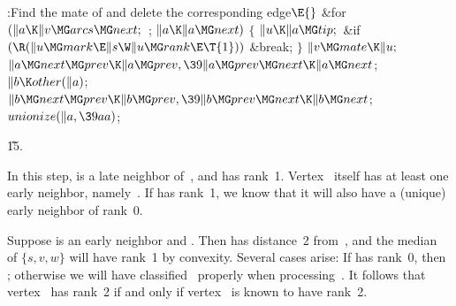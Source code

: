 \Y\B\4:Find the mate of  and delete the corresponding edge\X${}%
\E{}$\6
\&{for} ${}(\|a\K\|v\MG\\{arcs}\MG\\{next};{}$  ; ${}\|a\K\|a\MG\\{next}){}$\5
${}\{{}$\1\6
${}\|u\K\|a\MG\\{tip};{}$\6
\&{if} ${}(\R(\|u\MG\\{mark}\E\|s\W\|u\MG\\{rank}\E\T{1})){}$\1\5
\&{break};\2\6
\4${}\}{}$\2\6
${}\|v\MG\\{mate}\K\|u;{}$\6
${}\|a\MG\\{next}\MG\\{prev}\K\|a\MG\\{prev},\39\|a\MG\\{prev}\MG\\{next}\K\|a%
\MG\\{next}{}$;\6
${}\|b\K\\{other}(\|a){}$;\6
${}\|b\MG\\{next}\MG\\{prev}\K\|b\MG\\{prev},\39\|b\MG\\{prev}\MG\\{next}\K\|b%
\MG\\{next}{}$;\6
${}\\{unionize}(\|a,\39\\{aa}){}$;\par
\U15.\fi

In this step,  is a late neighbor of~, and %
 has
rank~1. Vertex~ itself has at least one early neighbor,
namely~. If  has rank~1, we know that it will also have a
(unique)
early neighbor of rank~0.

Suppose  is an early neighbor and . Then  has
distance~2
from~, and the median~ of $\{s,v,w\}$ will have rank~1
by convexity. Several cases arise: If  has rank~0, then ;
otherwise we will have classified~ properly when processing~.
It follows that vertex~ has rank~2 if and only if
vertex~ is known to have rank~2.

